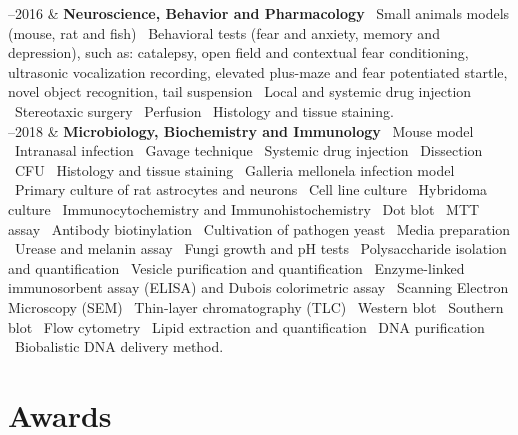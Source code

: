 \documentclass[11pt, a4paper]{article}
\newcommand{\Duration}[2]{\fontsize{10pt}{0}\selectfont #1--#2}
\begin{document}
\begin{EntriesTable}
	
	\Duration{2010}{2016}  &
	\textbf{Neuroscience, Behavior and Pharmacology}
	\newline
	 \textbullet \ Small animals models (mouse, rat and fish) 
	 \textbullet \ Behavioral tests (fear and anxiety, memory and depression), 
	 such as: catalepsy, open field and contextual fear conditioning, ultrasonic
	 vocalization recording, elevated plus-maze and fear potentiated startle, 
	 novel object recognition, tail suspension 
	 \textbullet \ Local and systemic drug injection 
	 \textbullet \ Stereotaxic surgery 
	 \textbullet \ Perfusion 
	 \textbullet \ Histology and tissue staining.
	\\
	
	\Duration{2014}{2018}  &
	\textbf{Microbiology, Biochemistry and Immunology}
	\newline
	\textbullet \ Mouse model 
	\textbullet \ Intranasal infection 
	\textbullet \ Gavage technique 
	\textbullet \ Systemic drug injection 
	\textbullet \ Dissection 
	\textbullet \ CFU 
	\textbullet \ Histology and tissue staining 
	\textbullet \ Galleria mellonela infection model 
	\textbullet \ Primary culture of rat astrocytes and neurons 
	\textbullet \ Cell line culture 
	\textbullet \ Hybridoma culture 
	\textbullet \ Immunocytochemistry and Immunohistochemistry 
	\textbullet \ Dot blot 
	\textbullet \ MTT assay 
	\textbullet \ Antibody biotinylation 
	\textbullet \ Cultivation of pathogen yeast 
	\textbullet \ Media preparation 
	\textbullet \ Urease and melanin assay 
	\textbullet \ Fungi growth and pH tests 
	\textbullet \ Polysaccharide isolation and quantification 
	\textbullet \ Vesicle purification and quantification 
	\textbullet \ Enzyme-linked immunosorbent assay (ELISA) and Dubois 
	colorimetric assay  
	\textbullet \ Scanning Electron Microscopy (SEM)  
	\textbullet \ Thin-layer chromatography (TLC) 
	\textbullet \ Western blot 
	\textbullet \ Southern blot 
	\textbullet \ Flow cytometry 
	\textbullet \ Lipid extraction and quantification 
	\textbullet \ DNA purification  
	\textbullet \ Biobalistic DNA delivery method. 
	\\

	
\end{EntriesTable}


\section*{Awards}
\end{document}
